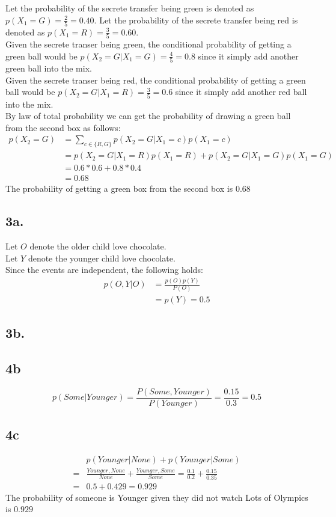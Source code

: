 \documentclass{article}
\begin{document}
Let the probability of the secrete transfer being green is denoted as $p(X_1=G) =
\frac{2}{5}=0.40$. Let the probability of the secrete transfer being red is
denoted as $p(X_1=R) = \frac{3}{5}=0.60$.\\ 
Given the secrete transer being green, the conditional probability
of getting a green ball would be $p(X_2=G | X_1=G)=\frac{4}{5} = 0.8$ since it
simply add another green ball into the mix.\\
Given the secrete transer being red, the conditional probability
of getting a green ball would be $p(X_2=G | X_1=R)=\frac{3}{5} = 0.6$ since it
simply add another red ball into the mix.\\
By law of total probability we can get the probability of drawing a green ball
from the second box as follows:
\begin{align*}
	p(X_2=G) &= \sum_{c \in \{R,G\}}p(X_2=G | X_1=c)p(X_1=c) \\
	         &= p(X_2=G | X_1=R)p(X_1=R) + p(X_2=G | X_1=G)p(X_1=G) \\
	         &= 0.6*0.6 + 0.8*0.4\\
					 &= 0.68
\end{align*}
The probability of getting a green box from the second box is $0.68$

\newpage
\subsection*{3a.}
Let $O$ denote the older child love chocolate.\\
Let $Y$ denote the younger child love chocolate.\\
Since the events are independent, the following holds:
\begin{align*}
	p(O, Y | O) &= \frac{p(O)p(Y)}{P(O)}\\
							&= p(Y) = 0.5
\end{align*}

\subsection*{3b.}

\subsection*{4b}
$$p(Some | Younger)=\frac{P(Some, Younger)}{P(Younger)}=\frac{0.15}{0.3}=0.5$$

\subsection*{4c}
\begin{align*}
&p(Younger|None) + p(Younger|Some)\\
=& \frac{Younger, None}{None} + \frac{Younger, Some}{Some} = \frac{0.1}{0.2} + \frac{0.15}{0.35}\\
=& 0.5 + 0.429 = 0.929
\end{align*}
The probability of someone is Younger given they did not watch Lots of Olympics
is $0.929$
\end{document}
